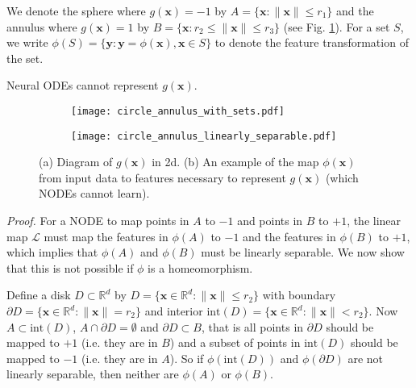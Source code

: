 \documentclass{article}
\begin{document}
We denote the sphere where $g(\mathbf{x}) = -1$ by $A = \{ \mathbf{x} : \|\mathbf{x}\| \leq r_1\}$ and the annulus where $g(\mathbf{x}) = 1$ by $B = \{ \mathbf{x} : r_2 \leq \|\mathbf{x}\| \leq r_3\}$ (see Fig. \ref{thm-explanation-fig}). For a set $S$, we write $\phi(S) = \{ \mathbf{y} : \mathbf{y} = \phi(\mathbf{x}), \mathbf{x} \in S\}$ to denote the feature transformation of the set.

\begin{customprop}{2} Neural ODEs cannot represent $g(\mathbf{x})$.
\end{customprop}

\begin{figure}[t]
\centering
\begin{subfigure}[t]{0.2\linewidth}
\centering
\texttt{[image: circle\_annulus\_with\_sets.pdf]}
\caption{}
\end{subfigure} \hspace{0.1\linewidth}
\begin{subfigure}[t]{0.45\linewidth}
\centering
\texttt{[image: circle\_annulus\_linearly\_separable.pdf]}
\caption{}
\end{subfigure}
\caption{(a) Diagram of $g(\mathbf{x})$ in 2d. (b) An example of the map $\phi(\mathbf{x})$ from input data to features necessary to represent $g(\mathbf{x})$ (which NODEs cannot learn).}
\label{thm-explanation-fig}
\end{figure}


\textit{Proof.} For a NODE to map points in $A$ to $-1$ and points in $B$ to $+1$, the linear map $\mathcal{L}$ must map the features in $\phi(A)$ to $-1$ and the features in $\phi(B)$ to $+1$, which implies that $\phi(A)$ and $\phi(B)$ must be linearly separable. We now show that this is not possible if $\phi$ is a homeomorphism.

Define a disk $D \subset \mathbb{R}^d$ by $D = \{ \mathbf{x} \in \mathbb{R}^d : \|\mathbf{x}\| \leq r_2 \}$ with boundary $\partial D = \{ \mathbf{x} \in \mathbb{R}^d : \|\mathbf{x}\| = r_2 \}$ and interior $\text{int}(D) = \{ \mathbf{x} \in \mathbb{R}^d : \|\mathbf{x}\| < r_2 \}$. Now $A \subset \text{int}(D)$, $A \cap \partial D = \emptyset$ and $\partial D \subset B$, that is all points in $\partial D$ should be mapped to $+1$ (i.e. they are in $B$) and a subset of points in $\text{int}(D)$ should be mapped to $-1$ (i.e. they are in $A$). So if $\phi(\text{int}(D))$ and $\phi(\partial D)$ are not linearly separable, then neither are $\phi(A)$ or $\phi(B)$. 
\end{document}
